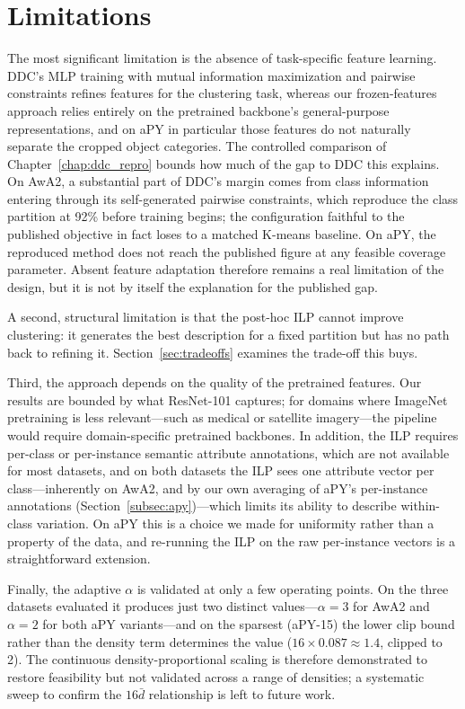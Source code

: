 \section{Limitations}
\label{sec:limitations}

The most significant limitation is the absence of task-specific feature learning. DDC's MLP training with mutual information maximization and pairwise constraints refines features for the clustering task, whereas our frozen-features approach relies entirely on the pretrained backbone's general-purpose representations, and on aPY in particular those features do not naturally separate the cropped object categories. The controlled comparison of Chapter~\ref{chap:ddc_repro} bounds how much of the gap to DDC this explains. On AwA2, a substantial part of DDC's margin comes from class information entering through its self-generated pairwise constraints, which reproduce the class partition at 92\% before training begins; the configuration faithful to the published objective in fact loses to a matched K-means baseline. On aPY, the reproduced method does not reach the published figure at any feasible coverage parameter. Absent feature adaptation therefore remains a real limitation of the design, but it is not by itself the explanation for the published gap.

A second, structural limitation is that the post-hoc ILP cannot improve clustering: it generates the best description for a fixed partition but has no path back to refining it. Section~\ref{sec:tradeoffs} examines the trade-off this buys.

Third, the approach depends on the quality of the pretrained features. Our results are bounded by what ResNet-101 captures; for domains where ImageNet pretraining is less relevant---such as medical or satellite imagery---the pipeline would require domain-specific pretrained backbones. In addition, the ILP requires per-class or per-instance semantic attribute annotations, which are not available for most datasets, and on both datasets the ILP sees one attribute vector per class---inherently on AwA2, and by our own averaging of aPY's per-instance annotations (Section~\ref{subsec:apy})---which limits its ability to describe within-class variation. On aPY this is a choice we made for uniformity rather than a property of the data, and re-running the ILP on the raw per-instance vectors is a straightforward extension.

Finally, the adaptive $\alpha$ is validated at only a few operating points. On the three datasets evaluated it produces just two distinct values---$\alpha = 3$ for AwA2 and $\alpha = 2$ for both aPY variants---and on the sparsest (aPY-15) the lower clip bound rather than the density term determines the value ($16 \times 0.087 \approx 1.4$, clipped to 2). The continuous density-proportional scaling is therefore demonstrated to restore feasibility but not validated across a range of densities; a systematic sweep to confirm the $16\bar{d}$ relationship is left to future work.


